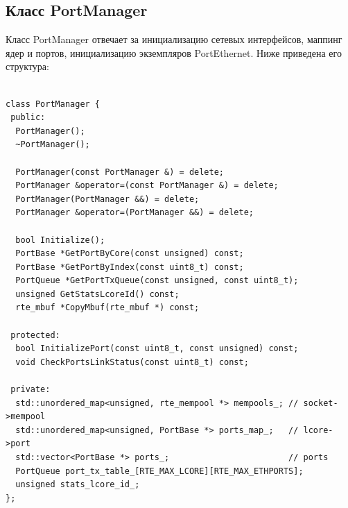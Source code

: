 \subsection{Класс PortManager}
Класс PortManager отвечает за инициализацию сетевых интерфейсов, маппинг ядер и портов, инициализацию экземпляров PortEthernet. Ниже приведена его структура:
\begin{lstlisting}

class PortManager {
 public:
  PortManager();
  ~PortManager();

  PortManager(const PortManager &) = delete;
  PortManager &operator=(const PortManager &) = delete;
  PortManager(PortManager &&) = delete;
  PortManager &operator=(PortManager &&) = delete;

  bool Initialize();
  PortBase *GetPortByCore(const unsigned) const;
  PortBase *GetPortByIndex(const uint8_t) const;
  PortQueue *GetPortTxQueue(const unsigned, const uint8_t);
  unsigned GetStatsLcoreId() const;
  rte_mbuf *CopyMbuf(rte_mbuf *) const;

 protected:
  bool InitializePort(const uint8_t, const unsigned) const;
  void CheckPortsLinkStatus(const uint8_t) const;

 private:
  std::unordered_map<unsigned, rte_mempool *> mempools_; // socket->mempool
  std::unordered_map<unsigned, PortBase *> ports_map_;   // lcore->port
  std::vector<PortBase *> ports_;                        // ports
  PortQueue port_tx_table_[RTE_MAX_LCORE][RTE_MAX_ETHPORTS];
  unsigned stats_lcore_id_;
};
\end{lstlisting}


